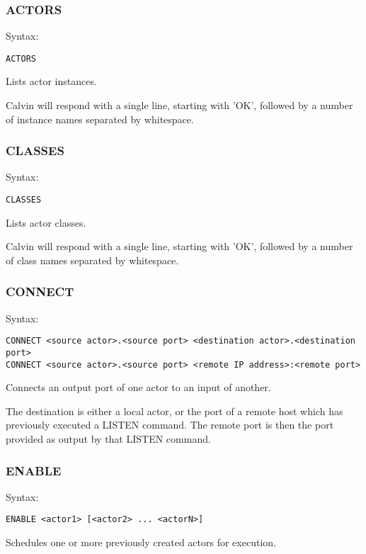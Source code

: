 \documentclass[10pt, a4paper]{article}
\begin{document}
\subsubsection*{ACTORS}

Syntax:
\begin{verbatim}
ACTORS
\end{verbatim}

Lists actor instances.

Calvin will respond with a single line, starting with 'OK', followed by a number of instance names separated by whitespace.

\subsubsection*{CLASSES}

Syntax:
\begin{verbatim}
CLASSES
\end{verbatim}

Lists actor classes.

Calvin will respond with a single line, starting with 'OK', followed by a number of class names separated by whitespace.

\subsubsection*{CONNECT}

Syntax:
\begin{verbatim}
CONNECT <source actor>.<source port> <destination actor>.<destination port>
CONNECT <source actor>.<source port> <remote IP address>:<remote port>
\end{verbatim}

Connects an output port of one actor to an input of another.

The destination is either a local actor, or the port of a remote host which has previously executed a LISTEN command. The remote port is then the port provided as output by that LISTEN command.

\subsubsection*{ENABLE}

Syntax:
\begin{verbatim}
ENABLE <actor1> [<actor2> ... <actorN>]
\end{verbatim}

Schedules one or more previously created actors for execution.
\end{document}
